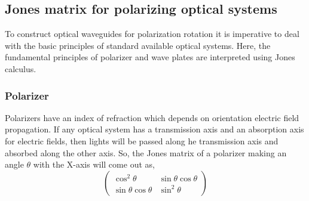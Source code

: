 \documentclass[../report.tex]{subfiles}
\begin{document}
		\subsection{Jones matrix for polarizing optical systems}
To construct optical waveguides for polarization rotation it is imperative to deal with the basic principles of standard available optical systems. Here, the fundamental principles of polarizer and wave plates are interpreted using Jones calculus.  
			\subsubsection{Polarizer}
Polarizers have an index of refraction which depends on orientation electric field propagation. If any optical system has a transmission axis and an absorption axis for electric fields, then lights will be passed along he transmission axis and absorbed along the other axis. So, the Jones matrix of a polarizer making an angle $\theta$ with the X-axis will come out as,
\begin{equation}\label{eq:jones_matrix_polarizer}
\left(\begin{matrix} 
\cos ^{2}\theta & \sin \theta \cos \theta \\ 
\sin \theta \cos \theta & \sin ^{2}\theta
\end{matrix} \right) 
\end{equation} 
\end{document}
